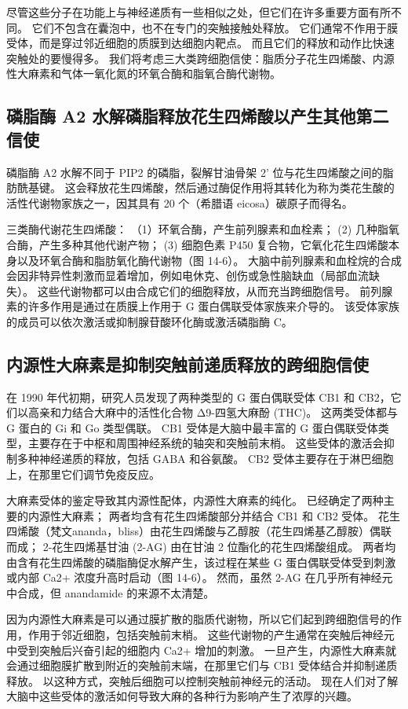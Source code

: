 尽管这些分子在功能上与神经递质有一些相似之处，但它们在许多重要方面有所不同。
它们不包含在囊泡中，也不在专门的突触接触处释放。 
它们通常不作用于膜受体，而是穿过邻近细胞的质膜到达细胞内靶点。
而且它们的释放和动作比快速突触处的要慢得多。
我们将考虑三大类跨细胞信使：脂质分子花生四烯酸、内源性大麻素和气体一氧化氮的环氧合酶和脂氧合酶代谢物。


\subsection{磷脂酶 A2 水解磷脂释放花生四烯酸以产生其他第二信使}

磷脂酶 A2 水解不同于 PIP2 的磷脂，裂解甘油骨架 2' 位与花生四烯酸之间的脂肪酰基键。
这会释放花生四烯酸，然后通过酶促作用将其转化为称为类花生酸的活性代谢物家族之一，因其具有 20 个（希腊语 eicosa）碳原子而得名。


三类酶代谢花生四烯酸：
（1）环氧合酶，产生前列腺素和血栓素； 
(2) 几种脂氧合酶，产生多种其他代谢产物； 
(3) 细胞色素 P450 复合物，它氧化花生四烯酸本身以及环氧合酶和脂肪氧化酶代谢物（图 14-6）。 
大脑中前列腺素和血栓烷的合成会因非特异性刺激而显着增加，例如电休克、创伤或急性脑缺血（局部血流缺失）。
这些代谢物都可以由合成它们的细胞释放，从而充当跨细胞信号。
前列腺素的许多作用是通过在质膜上作用于 G 蛋白偶联受体家族来介导的。
该受体家族的成员可以依次激活或抑制腺苷酸环化酶或激活磷脂酶 C。


\subsection{内源性大麻素是抑制突触前递质释放的跨细胞信使}
在 1990 年代初期，研究人员发现了两种类型的 G 蛋白偶联受体 CB1 和 CB2，它们以高亲和力结合大麻中的活性化合物 Δ9-四氢大麻酚 (THC)。 
这两类受体都与 G 蛋白的 Gi 和 Go 类型偶联。 
CB1 受体是大脑中最丰富的 G 蛋白偶联受体类型，主要存在于中枢和周围神经系统的轴突和突触前末梢。 
这些受体的激活会抑制多种神经递质的释放，包括 GABA 和谷氨酸。 
CB2 受体主要存在于淋巴细胞上，在那里它们调节免疫反应。


大麻素受体的鉴定导致其内源性配体，内源性大麻素的纯化。 
已经确定了两种主要的内源性大麻素； 两者均含有花生四烯酸部分并结合 CB1 和 CB2 受体。 
花生四烯酸（梵文ananda，bliss）由花生四烯酸与乙醇胺（花生四烯基乙醇胺）偶联而成； 
2-花生四烯基甘油 (2-AG) 由在甘油 2 位酯化的花生四烯酸组成。 
两者均由含有花生四烯酸的磷脂酶促水解产生，该过程在某些 G 蛋白偶联受体受到刺激或内部 Ca2+ 浓度升高时启动（图 14-6）。 
然而，虽然 2-AG 在几乎所有神经元中合成，但 anandamide 的来源不太清楚。


因为内源性大麻素是可以通过膜扩散的脂质代谢物，所以它们起到跨细胞信号的作用，作用于邻近细胞，包括突触前末梢。
这些代谢物的产生通常在突触后神经元中受到突触后兴奋引起的细胞内 Ca2+ 增加的刺激。
一旦产生，内源性大麻素就会通过细胞膜扩散到附近的突触前末端，在那里它们与 CB1 受体结合并抑制递质释放。
以这种方式，突触后细胞可以控制突触前神经元的活动。 
现在人们对了解大脑中这些受体的激活如何导致大麻的各种行为影响产生了浓厚的兴趣。



